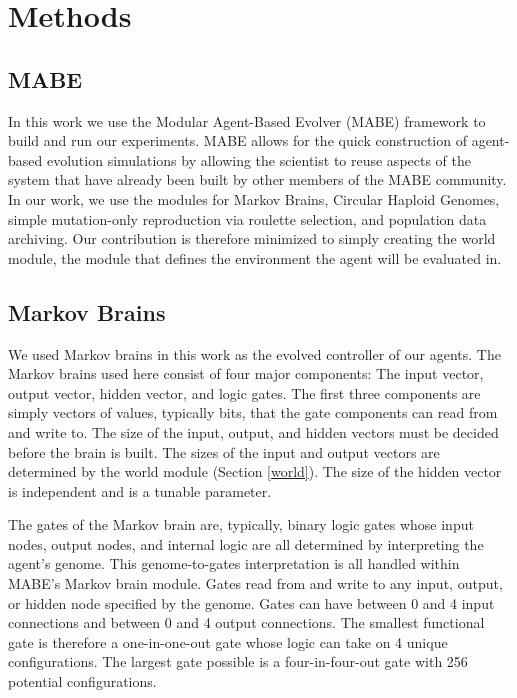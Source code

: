 \section{Methods}

\subsection{MABE}\label{mabe}

In this work we use the Modular Agent-Based Evolver\cite{bohm_mabe_2017} (MABE) framework to build and run our experiments. MABE allows for the quick construction of agent-based evolution simulations by allowing the scientist to reuse aspects of the system that have already been built by other members of the MABE community. In our work, we use the modules for Markov Brains, Circular Haploid Genomes, simple mutation-only reproduction via roulette selection, and population data archiving. Our contribution is therefore minimized to simply creating the world module, the module that defines the environment the agent will be evaluated in.

\subsection*{Markov Brains}

We used Markov brains in this work as the evolved controller of our agents. The Markov brains used here consist of four major components: The input vector, output vector, hidden vector, and logic gates. The first three components are simply vectors of values, typically bits, that the gate components can read from and write to. The size of the input, output, and hidden vectors must be decided before the brain is built. The sizes of the input and output vectors are determined by the world module (Section \ref{world}). The size of the hidden vector is independent and is a tunable parameter.

The gates of the Markov brain are, typically, binary logic gates whose input nodes, output nodes, and internal logic are all determined by interpreting the agent's genome. This genome-to-gates interpretation is all handled within MABE's Markov brain module. Gates read from and write to any input, output, or hidden node specified by the genome. Gates can have between 0 and 4 input connections and between 0 and 4 output connections. The smallest functional gate is therefore a one-in-one-out gate whose logic can take on 4 unique configurations. The largest gate possible is a four-in-four-out gate with 256 potential configurations.

